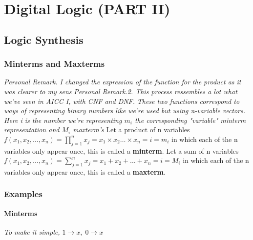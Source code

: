 \documentclass[12pt,openany, tikz,border=10pt]{book}
\begin{document}
\begin{multicols}{3}
            \end{multicols} %
            
        
        
\chapter{Digital Logic (PART II)}
\section{Logic Synthesis}
\subsection{Minterms and Maxterms}
\textit{Personal Remark. I changed the expression of the function for the product as it was clearer to my sens} \newline
\vspace{10px}
\textit{Personal Remark.2. This process ressembles a lot what we've seen in AICC I, with CNF and DNF.} \newline
\vspace{10px}
\textit{These two functions correspond to ways of representing binary numbers like we're used but using n-variable vectors. Here i is the number we're representing $m_i$ the corresponding "variable" minterm representation and $M_i$ maxterm's}\newline
\vspace{10px}
Let a product of n variables $f(x_{1}, x_{2}, \ldots, x_{n}) = \prod_{j=1}^{n}x_{j} = x_{1} \times x_{2} \ldots \times x_n = i = m_i$ in which each of the n variables only appear once, this is called a \textbf{minterm}. \newline
\vspace{5px}
Let a sum of n variables $f(x_{1}, x_{2}, \ldots, x_{n}) = \sum_{j=1}^{n}x_{j} = x_{1} + x_{2} + \ldots + x_n = i = M_i$ in which each of the n variables only appear once, this is called a \textbf{maxterm}. \newline

\vspace*{-10px}
\subsection{Examples}
\subsubsection*{Minterms}
\textit{To make it simple, $1 \rightarrow x, \; 0 \rightarrow \overline{x} $} \newline
\end{document}
